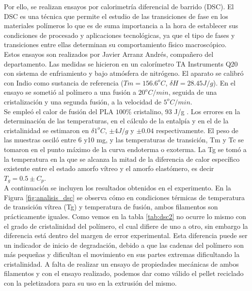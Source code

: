 Por ello, se realizan ensayos por calorimetría diferencial de barrido (DSC). El DSC es una técnica que permite el estudio de las transiciones de fase en los materiales polímeros \cite{DSC1} lo que es de suma importancia a la hora de establecer sus condiciones de procesado y aplicaciones tecnológicas, ya que el tipo de fases y transiciones entre ellas determinan su comportamiento físico macroscópico.\\

Estos ensayos son realizados por Javier Arranz Andrés, compañero del departamento. Las medidas se hicieron en un calorímetro TA Instruments Q20 con sistema de enfriamiento y bajo atmósfera de nitrógeno. El aparato se calibró con Indio como sustancia de referencia ($Tm = 156.6 ^o C$, $\delta H = 28.45 J/g$). En el ensayo se sometió al polímero a una fusión a $20 ^o C/min$, seguida de una cristalización y una segunda fusión, a la velocidad de $5 ^o C/min$.\\

Se empleó el calor de fusión del PLA $100\%$ cristalino, 93 J/g \cite{DSC}. Los errores en la determinación de las temperaturas, en el cálculo de la entalpía y en el de la cristalinidad se estimaron en $\delta1 ^o C$, $\pm4 J/g$ y $\pm0.04$ respectivamente. El peso de las muestras osciló entre 6 y10 mg, y las temperaturas de transición, Tm y Tc se tomaron en el punto máximo de la curva endoterma o exoterma. La Tg se tomó a la temperatura en la que se alcanza la mitad de la diferencia de calor específico existente entre el estado amorfo vítreo y el amorfo elastómero, es decir $T_{g} = 0.5 \pm C_{p}$.\\

A continuación se incluyen los resultados obtenidos en el experimento. En la Figura \ref{fig:analisis_dsc} se observa cómo en condiciones térmicas de temperatura de transición vítrea (Tg) y temperatura de fusión, ambos filamentos son prácticamente iguales. Como vemos en la tabla \ref{tab:dsc2} no ocurre lo mismo con el grado de cristalinidad del polímero, el cual difiere de uno a otro, sin embargo la diferencia está dentro del margen de error experimental. Esta diferencia puede ser un indicador de inicio de degradación, debido a que las cadenas del polímero son más pequeñas y dificultan el movimiento en sus partes extremas dificultando la cristalinidad. A falta de realizar un ensayo de propiedades mecánicas de ambos filamentos y con el ensayo realizado, podemos dar como válido el pellet reciclado con la peletizadora para su uso en la extrusión del mismo.

